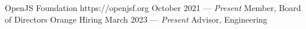 \documentclass{resume}
\begin{document}
\employer
    {OpenJS Foundation}
    {https://openjsf.org}
    {October 2021 --- \emph{Present}}
    {Member, Board of Directors}
    {}
\employer
    {Orange Hiring}
    {}
    {March 2023 --- \emph{Present}}
    {Advisor, Engineering}
    {}
% 
% 
% 
% 
\end{document}
